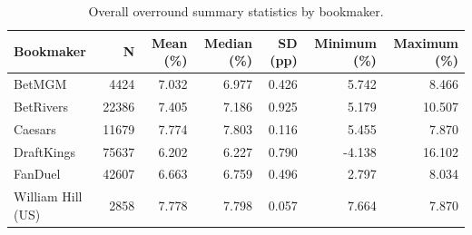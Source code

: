 \begin{table}
\caption{Overall overround summary statistics by bookmaker.}
\label{tab:overall_overround}
\begin{tabular}{lrrrrrr}
\toprule
Bookmaker & N & Mean (\%) & Median (\%) & SD (pp) & Minimum (\%) & Maximum (\%) \\
\midrule
BetMGM & 4424 & 7.032 & 6.977 & 0.426 & 5.742 & 8.466 \\
BetRivers & 22386 & 7.405 & 7.186 & 0.925 & 5.179 & 10.507 \\
Caesars & 11679 & 7.774 & 7.803 & 0.116 & 5.455 & 7.870 \\
DraftKings & 75637 & 6.202 & 6.227 & 0.790 & -4.138 & 16.102 \\
FanDuel & 42607 & 6.663 & 6.759 & 0.496 & 2.797 & 8.034 \\
William Hill (US) & 2858 & 7.778 & 7.798 & 0.057 & 7.664 & 7.870 \\
\bottomrule
\end{tabular}
\end{table}
